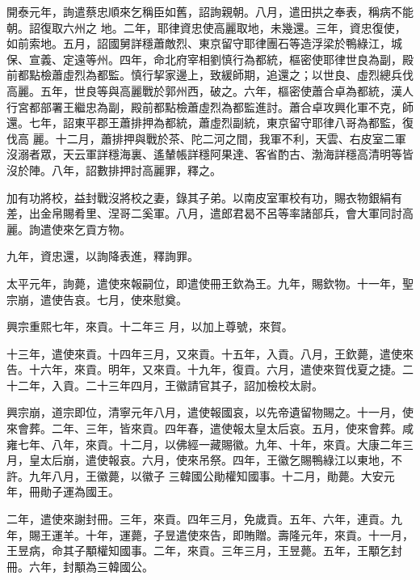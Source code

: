 \begin{pinyinscope}
 開泰元年，詢遣蔡忠順來乞稱臣如舊，詔詢親朝。八月，遣田拱之奉表，稱病不能朝。詔復取六州之
 地。二年，耶律資忠使高麗取地，未幾還。三年，資忠復使，如前索地。五月，詔國舅詳穩蕭敵烈、東京留守耶律團石等造浮梁於鴨綠江，城保、宣義、定遠等州。四年，命北府宰相劉慎行為都統，樞密使耶律世良為副，殿前都點檢蕭虛烈為都監。慎行挈家邊上，致緩師期，追還之；以世良、虛烈總兵伐高麗。五年，世良等與高麗戰於郭州西，破之。六年，樞密使蕭合卓為都統，漢人行宮都部署王繼忠為副，殿前都點檢蕭虛烈為都監進討。蕭合卓攻興化軍不克，師還。七年，詔東平郡王蕭排押為都統，蕭虛烈副統，東京留守耶律八哥為都監，復伐高
 麗。十二月，蕭排押與戰於茶、陀二河之間，我軍不利，天雲、右皮室二軍沒溺者眾，天云軍詳穩海裏、遙輦帳詳穩阿果達、客省酌古、渤海詳穩高清明等皆沒於陣。八年，詔數排押討高麗罪，釋之。



 加有功將校，益封戰沒將校之妻，錄其子弟。以南皮室軍校有功，賜衣物銀絹有差，出金帛賜肴里、涅哥二奚軍。八月，遣郎君曷不呂等率諸部兵，會大軍同討高麗。詢遣使來乞貢方物。



 九年，資忠還，以詢降表進，釋詢罪。



 太平元年，詢薨，遣使來報嗣位，即遣使冊王欽為王。九年，賜欽物。十一年，聖宗崩，遣使告哀。七月，使來慰奠。



 興宗重熙七年，來貢。十二年三
 月，以加上尊號，來賀。



 十三年，遣使來貢。十四年三月，又來貢。十五年，入貢。八月，王欽薨，遣使來告。十六年，來貢。明年，又來貢。十九年，復貢。六月，遣使來賀伐夏之捷。二十二年，入貢。二十三年四月，王徽請官其子，詔加檢校太尉。



 興宗崩，道宗即位，清寧元年八月，遣使報國哀，以先帝遺留物賜之。十一月，使來會葬。二年、三年，皆來貢。四年春，遣使報太皇太后哀。五月，使來會葬。咸雍七年、八年，來貢。十二月，以佛經一藏賜徽。九年、十年，來貢。大康二年三月，皇太后崩，遣使報哀。六月，使來吊祭。四年，王徽乞賜鴨綠江以東地，不許。九年八月，王徽薨，以徽子
 三韓國公勛權知國事。十二月，勛薨。大安元年，冊勛子運為國王。



 二年，遣使來謝封冊。三年，來貢。四年三月，免歲貢。五年、六年，連貢。九年，賜王運羊。十年，運薨，子昱遣使來告，即賄贈。壽隆元年，來貢。十一月，王昱病，命其子顒權知國事。二年，來貢。三年三月，王昱薨。五年，王顒乞封冊。六年，封顒為三韓國公。




\end{pinyinscope}
